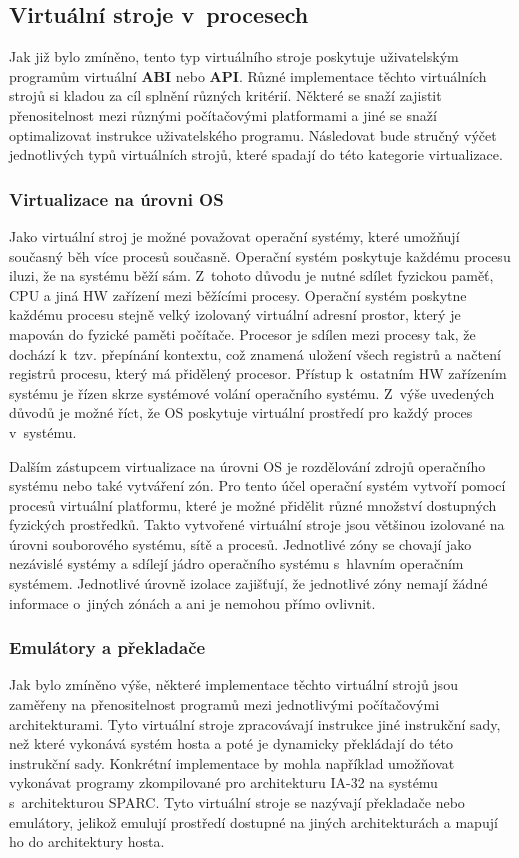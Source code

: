 \subsection{Virtuální stroje v~procesech}
\label{chapter:virtualization:clasification:process_vm}
Jak již bylo zmíněno, tento typ virtuálního stroje poskytuje uživatelským programům virtuální \textbf{ABI} nebo \textbf{API}.
Různé implementace těchto virtuálních strojů si kladou za cíl splnění různých kritérií. Některé se snaží zajistit přenositelnost
mezi různými počítačovými platformami a jiné se snaží optimalizovat instrukce uživatelského programu. Následovat bude stručný
výčet jednotlivých typů virtuálních strojů, které spadají do této kategorie virtualizace.      
\subsubsection{Virtualizace na úrovni OS}
\label{chapter:virtualization:clasification:process_vm:os_level_virtualization}
Jako virtuální stroj je možné považovat
operační systémy, které umožňují současný běh více procesů současně. Operační systém poskytuje každému procesu iluzi, že na
systému běží sám. Z~tohoto důvodu je nutné sdílet fyzickou paměť, CPU a jiná HW zařízení mezi běžícími procesy. Operační systém
poskytne každému procesu stejně velký izolovaný virtuální adresní prostor, který je mapován do fyzické paměti počítače. Procesor
je sdílen mezi procesy tak, že dochází k~tzv. přepínání kontextu, což znamená uložení všech registrů a načtení registrů
procesu, který má přidělený procesor. Přístup k~ostatním HW zařízením systému je řízen skrze systémové volání operačního systému.
Z~výše uvedených důvodů je možné říct, že OS poskytuje virtuální prostředí pro každý proces v~systému.

Dalším zástupcem virtualizace na úrovni OS je rozdělování zdrojů operačního systému nebo také vytváření zón. Pro tento účel
operační systém vytvoří pomocí procesů virtuální platformu, které je možné přidělit různé množství dostupných fyzických 
prostředků. Takto vytvořené virtuální stroje jsou většinou izolované na úrovni souborového systému, sítě a procesů. Jednotlivé
zóny se chovají jako nezávislé systémy a sdílejí jádro operačního systému s~hlavním operačním systémem. Jednotlivé úrovně 
izolace zajišťují, že jednotlivé zóny nemají žádné informace o~jiných zónách a ani je nemohou přímo ovlivnit.
\subsubsection{Emulátory a překladače}
\label{chapter:virtualization:clasification:process_vm:emulation}
Jak bylo zmíněno výše, některé implementace těchto virtuální strojů jsou zaměřeny na přenositelnost programů mezi jednotlivými
počítačovými architekturami. Tyto virtuální stroje zpracovávají instrukce jiné instrukční sady, než které vykonává systém hosta a poté
je dynamicky překládají do této instrukční sady. Konkrétní implementace by mohla například umožňovat vykonávat programy zkompilované
pro architekturu IA-32 na systému s~architekturou SPARC. Tyto virtuální stroje se nazývají překladače nebo emulátory, jelikož
emulují prostředí dostupné na jiných architekturách a mapují ho do architektury hosta.    
